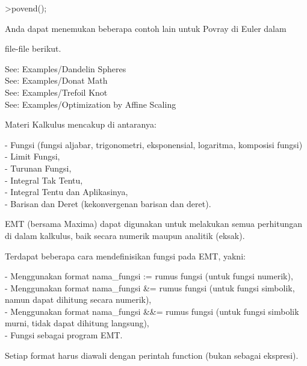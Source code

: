 \documentclass[a4paper,10pt]{article}
\begin{document}
\begin{eulernotebook}
\begin{eulercomment}
\begin{eulercomment}
\begin{eulercomment}
\begin{eulercomment}
\begin{eulercomment}
\begin{eulercomment}
\begin{eulercomment}
\begin{eulercomment}
\begin{eulercomment}
\begin{eulercomment}
\begin{eulercomment}
\begin{eulercomment}
\begin{eulercomment}
\begin{eulercomment}
\begin{eulercomment}
\begin{eulercomment}
\begin{eulerprompt}
>povend();
\end{eulerprompt}
\begin{eulercomment}
\end{eulercomment}
\begin{eulerttcomment}
 Anda dapat menemukan beberapa contoh lain untuk Povray di Euler dalam
\end{eulerttcomment}
\begin{eulercomment}
file-file berikut.

See: Examples/Dandelin Spheres\\
See: Examples/Donat Math\\
See: Examples/Trefoil Knot\\
See: Examples/Optimization by Affine Scaling
\end{eulercomment}
\begin{eulercomment}
Materi Kalkulus mencakup di antaranya:

- Fungsi (fungsi aljabar, trigonometri, eksponensial, logaritma,
komposisi fungsi)\\
- Limit Fungsi,\\
- Turunan Fungsi,\\
- Integral Tak Tentu,\\
- Integral Tentu dan Aplikasinya,\\
- Barisan dan Deret (kekonvergenan barisan dan deret).

EMT (bersama Maxima) dapat digunakan untuk melakukan semua perhitungan
di dalam kalkulus, baik secara numerik maupun analitik (eksak).

\end{eulercomment}
\begin{eulercomment}
Terdapat beberapa cara mendefinisikan fungsi pada EMT, yakni:

- Menggunakan format nama\_fungsi := rumus fungsi (untuk fungsi
numerik),\\
- Menggunakan format nama\_fungsi \&= rumus fungsi (untuk fungsi
simbolik, namun dapat dihitung secara numerik),\\
- Menggunakan format nama\_fungsi \&\&= rumus fungsi (untuk fungsi
simbolik murni, tidak dapat dihitung langsung),\\
- Fungsi sebagai program EMT.

Setiap format harus diawali dengan perintah function (bukan sebagai
ekspresi).


\end{eulercomment}
\end{eulercomment}
\end{eulercomment}
\end{eulercomment}
\end{eulercomment}
\end{eulercomment}
\end{eulercomment}
\end{eulercomment}
\end{eulercomment}
\end{eulercomment}
\end{eulercomment}
\end{eulercomment}
\end{eulercomment}
\end{eulercomment}
\end{eulercomment}
\end{eulercomment}
\end{eulercomment}
\end{eulernotebook}
\end{document}
